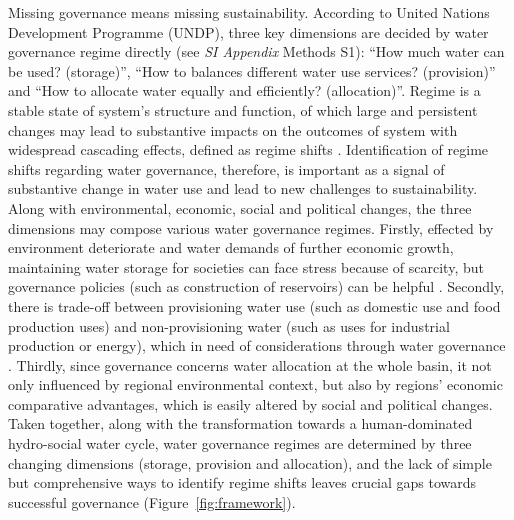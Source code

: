 \documentclass[9pt, twocolumn, twoside, lineno]{pnas-new}
\begin{document}
\label{introduction-section-2}
Missing governance means missing sustainability.
According to United Nations Development Programme (UNDP), three key dimensions are decided by water governance regime directly (see \textit{SI Appendix} Methods S1): ``How much water can be used? (storage)'', ``How to balances different water use services? (provision)'' and ``How to allocate water equally and efficiently? (allocation)''.
Regime is a stable state of system’s structure and function, of which large and persistent changes may lead to substantive impacts on the outcomes of system with widespread cascading effects, defined as regime shifts 
\cite{rochaCascadingRegimeShifts2018,schefferCatastrophicRegimeShifts2003, schefferCatastrophicShiftsEcosystems2001}.
Identification of regime shifts regarding water governance, therefore, is important as a signal of substantive change in water use and lead to new challenges to sustainability.
Along with environmental, economic, social and political changes, the three dimensions may compose various water governance regimes. 
Firstly, effected by environment deteriorate and water demands of further economic growth, maintaining water storage for societies can face stress because of scarcity, but governance policies (such as construction of reservoirs) can be helpful
\cite{postelHumanAppropriationRenewable1996, greveGlobalAssessmentWater2018, qinFlexibilityIntensityGlobal2019}.
Secondly, there is trade-off between provisioning water use (such as domestic use and food production uses) and non-provisioning water (such as uses for industrial production or energy), which in need of considerations through water governance
\cite{liuWaterScarcityAssessments2017, florkeWaterCompetitionCities2018}.
Thirdly, since governance concerns water allocation at the whole basin, it not only influenced by regional environmental context, but also by regions' economic comparative advantages, which is easily altered by social and political changes.
Taken together, along with the transformation towards a human-dominated hydro-social water cycle, water governance regimes are determined by three changing dimensions (storage, provision and allocation), and the lack of simple but comprehensive ways to identify regime shifts leaves crucial gaps towards successful governance (Figure~\ref{fig:framework}).
\end{document}
